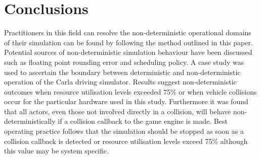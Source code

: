 \documentclass[letterpaper, 10 pt, journal, twoside]{IEEEtran}
\begin{document}

\section{Conclusions}\label{s:conclusion}
Practitioners in this field can resolve the non-deterministic operational domains of their simulation can be found by following the method outlined in this paper. Potential sources of non-deterministic simulation behaviour have been discussed such as floating point rounding error and scheduling policy. A case study was used to ascertain the boundary between deterministic and non-deterministic operation of the Carla driving simulator. Results suggest non-deterministic outcomes when resource utilisation levels exceeded 75\% or when vehicle collisions occur for the particular hardware used in this study. Furthermore it was found that all actors, even those not involved directly in a collision, will behave non-deterministically if a collision callback to the game engine is made. Best operating practice follows that the simulation should be stopped as soon as a collision callback is detected or resource utilisation levels exceed 75\% although this value may be system specific. 

\end{document}
